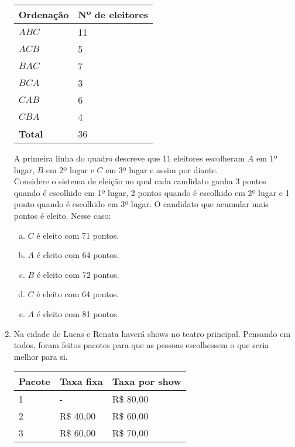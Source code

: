 \documentclass[a4paper,14pt]{article}
\begin{document}
\begin{multicols}{2}
\begin{enumerate}
			\begin{table}[H]
				\begin{tabular}{|p{3.5cm}|p{3.5cm}|}
					\hline
					\textbf{Ordenação} & \textbf{Nº de eleitores}  \\ \hline
					$A B C$ & 11  \\ \hline
					$A C B$ & 5 \\ \hline
					$B A C$ & 7 \\ \hline
					$B C A$ & 3 \\ \hline
					$C A B$ & 6  \\ \hline
					$C B A$ & 4  \\ \hline
					\textbf{Total} & 36  \\ \hline
				\end{tabular}
			\end{table}
			A primeira linha do quadro descreve que 11 eleitores escolheram $A$ em 1º lugar, $B$ em 2º lugar e $C$ em 3º lugar e assim por diante. \\
			Considere o sistema de eleição no qual cada candidato ganha 3 pontos quando é escolhido em 1º lugar, 2 pontos quando é escolhido em 2º lugar e 1 ponto quando é escolhido em 3º lugar. O candidato que acumular mais pontos é eleito. Nesse caso:
			\\
			\begin{enumerate}[a)]
				\item $C$ é eleito com 71 pontos.
				\item $A$ é eleito com 64 pontos.
				\item $B$ é eleito com 72 pontos.
				\item $C$ é eleito com 64 pontos.
				\item $A$ é eleito com 81 pontos.
			\end{enumerate}
			\item Na cidade de Lucas e Renata haverá shows no teatro principal. Pensando em todos, foram feitos pacotes para que as pessoas escolhessem o que seria melhor para si.
			\begin{table}[H]
				\begin{tabular}{|p{2cm}|p{2.6cm}|p{2.6cm}|}
					\hline
					\textbf{Pacote} & \textbf{Taxa fixa} & \textbf{Taxa por show} \\ \hline
					1 & - & R\$ 80,00 \\ \hline
					2 & R\$ 40,00 & R\$ 60,00 \\ \hline
					3 & R\$ 60,00 & R\$ 70,00 \\ \hline
				\end{tabular}

\end{table}
\end{enumerate}
\end{multicols}
\end{document}
